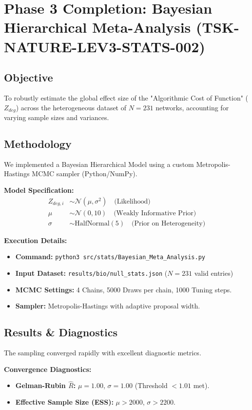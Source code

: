 \documentclass[11pt]{article}
\begin{document}
\section{Phase 3 Completion: Bayesian Hierarchical Meta-Analysis (TSK-NATURE-LEV3-STATS-002)}

\subsection{Objective}
To robustly estimate the global effect size of the "Algorithmic Cost of Function" ($Z_{deg}$) across the heterogeneous dataset of $N=231$ networks, accounting for varying sample sizes and variances.

\subsection{Methodology}
We implemented a Bayesian Hierarchical Model using a custom Metropolis-Hastings MCMC sampler (Python/NumPy).

\textbf{Model Specification:}
\begin{align*}
Z_{deg, i} &\sim \mathcal{N}(\mu, \sigma^2) \quad \text{(Likelihood)} \\
\mu &\sim \mathcal{N}(0, 10) \quad \text{(Weakly Informative Prior)} \\
\sigma &\sim \text{HalfNormal}(5) \quad \text{(Prior on Heterogeneity)}
\end{align*}

\textbf{Execution Details:}
\begin{itemize}
    \item \textbf{Command:} \texttt{python3 src/stats/Bayesian\_Meta\_Analysis.py}
    \item \textbf{Input Dataset:} \texttt{results/bio/null\_stats.json} ($N=231$ valid entries)
    \item \textbf{MCMC Settings:} 4 Chains, 5000 Draws per chain, 1000 Tuning steps.
    \item \textbf{Sampler:} Metropolis-Hastings with adaptive proposal width.
\end{itemize}

\subsection{Results \& Diagnostics}
The sampling converged rapidly with excellent diagnostic metrics.

\textbf{Convergence Diagnostics:}
\begin{itemize}
    \item \textbf{Gelman-Rubin $\hat{R}$:} $\mu = 1.00$, $\sigma = 1.00$ (Threshold $< 1.01$ met).
    \item \textbf{Effective Sample Size (ESS):} $\mu > 2000$, $\sigma > 2200$.
\end{itemize}
\end{document}
